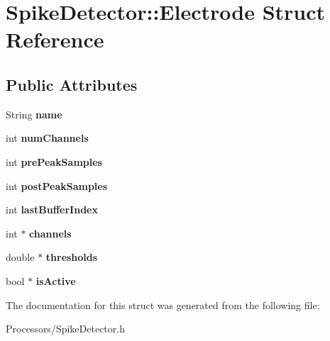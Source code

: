 \hypertarget{structSpikeDetector_1_1Electrode}{\section{Spike\-Detector\-:\-:Electrode Struct Reference}
\label{structSpikeDetector_1_1Electrode}
}
\subsection*{Public Attributes}
\begin{DoxyCompactItemize}
\item 
\hypertarget{structSpikeDetector_1_1Electrode_a27773e746444f91b64a02e262f0f693e}{String {\bfseries name}}\label{structSpikeDetector_1_1Electrode_a27773e746444f91b64a02e262f0f693e}

\item 
\hypertarget{structSpikeDetector_1_1Electrode_af4d01374066d650c8e33009e659cfabd}{int {\bfseries num\-Channels}}\label{structSpikeDetector_1_1Electrode_af4d01374066d650c8e33009e659cfabd}

\item 
\hypertarget{structSpikeDetector_1_1Electrode_a29c1a3dffd5218caf29bce86c3b2ae12}{int {\bfseries pre\-Peak\-Samples}}\label{structSpikeDetector_1_1Electrode_a29c1a3dffd5218caf29bce86c3b2ae12}

\item 
\hypertarget{structSpikeDetector_1_1Electrode_a1b94c165f436b181dbaae51429312e8f}{int {\bfseries post\-Peak\-Samples}}\label{structSpikeDetector_1_1Electrode_a1b94c165f436b181dbaae51429312e8f}

\item 
\hypertarget{structSpikeDetector_1_1Electrode_a80465ab3daafd065759f97b7016bd819}{int {\bfseries last\-Buffer\-Index}}\label{structSpikeDetector_1_1Electrode_a80465ab3daafd065759f97b7016bd819}

\item 
\hypertarget{structSpikeDetector_1_1Electrode_a0110e135ec9b668c7e4bc36f17f0fd96}{int $\ast$ {\bfseries channels}}\label{structSpikeDetector_1_1Electrode_a0110e135ec9b668c7e4bc36f17f0fd96}

\item 
\hypertarget{structSpikeDetector_1_1Electrode_a69ebc7bf7878c7050d58e397da658dec}{double $\ast$ {\bfseries thresholds}}\label{structSpikeDetector_1_1Electrode_a69ebc7bf7878c7050d58e397da658dec}

\item 
\hypertarget{structSpikeDetector_1_1Electrode_a571092ec10ce636abc11ef782d4f329f}{bool $\ast$ {\bfseries is\-Active}}\label{structSpikeDetector_1_1Electrode_a571092ec10ce636abc11ef782d4f329f}

\end{DoxyCompactItemize}


The documentation for this struct was generated from the following file\-:\begin{DoxyCompactItemize}
\item 
Processors/Spike\-Detector.\-h\end{DoxyCompactItemize}
